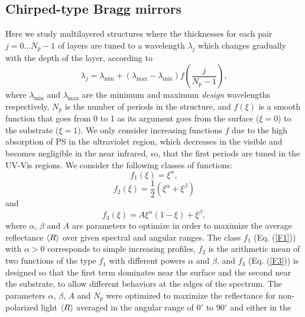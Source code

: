 \documentclass[a4paper,fleqn]{cas-sc}
\begin{document}
	
	\subsection{Chirped-type Bragg mirrors}\label{ss:chirped}
	
	
	Here we study multilayered structures where the thicknesses for each
	pair $j=0\ldots N_p-1$ of layers are tuned to a wavelength $\lambda_j$ which changes
	gradually with the depth of the layer, according to
	\begin{equation}
		\lambda_{j}=\lambda_{\min }+\left(\lambda_{\max }-\lambda_{\min}\right) f\left(\frac{j}{N_p-1}\right),\label{Dis}
	\end{equation}%
	where $\lambda_{\min }$ and $\lambda_{\max }$ are the minimum and
	maximum {\em design} wavelengths respectively, $N_p$ is the number of
	periods  in the structure, and $f(\xi)$ is a smooth function that
	goes from 0 to 1 as its argument goes from the surface ($\xi=0$) to the
	substrate ($\xi=1)$. We only consider increasing functions $f$ due to
	the high absorption of PS in the ultraviolet region, which decreases in
	the visible and becomes negligible in the near infrared, so, that the first
	periods are tuned in the UV-Vis regions. We consider the
	following classes of functions:
	\begin{equation}
		f_{1}\left(\xi \right) =\xi^{\alpha },  \label{F1}
	\end{equation}
	\begin{equation}
		f_{2}\left(\xi \right) =\frac{1}{2}\left(\xi^{\alpha }+\xi^{\beta}\right)
		\label{F2}
	\end{equation}
	and%
	\begin{equation}
		f_{3}\left(\xi\right) =A\xi^{\alpha }\left(1-\xi\right) +\xi^{\beta },  \label{F3}
	\end{equation}
	where $\alpha$, $\beta$ and $A$ are parameters to optimize in order
	to maximize the average reflectance $\braket{R}$ over given spectral
	and angular ranges. The class
	$f_{1}$ (Eq. (\ref {F1})) with  $\alpha>0$ corresponds to simple
	increasing profiles, $f_2$ is the arithmetic mean
	of two functions of the type $f_{1}$ with different
	powers $\alpha$ and $\beta$, and $f_{3}$ (Eq. (\ref{F3})) is
	designed so that the first term dominates near the surface and the
	second near the substrate, to allow different behaviors
	at the edges of the spectrum.
	The parameters
	$\alpha$, $\beta$, $A$ and $N_{p}$ were optimized to maximize the
	reflectance for non-polarized light $\braket{R}$ averaged in the
	angular range of $0^\circ$ to $90^\circ$ and either in the
\end{document}

